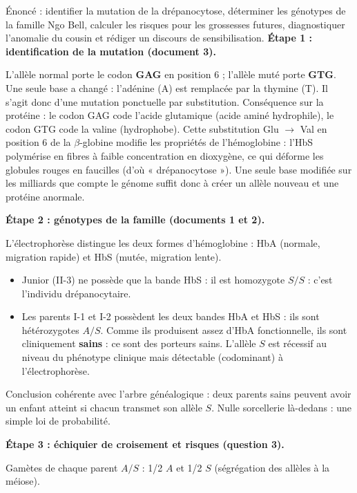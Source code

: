 \documentclass[11pt]{article}
\newcommand{\cle}[1]{{\popxbold\color{popdark}#1}}
\begin{document}
\begin{exoresolu}
Énoncé : identifier la mutation de la drépanocytose, déterminer les génotypes de la famille Ngo Bell, calculer les risques pour les grossesses futures, diagnostiquer l'anomalie du cousin et rédiger un discours de sensibilisation.
\tcblower
\textbf{Étape 1 : identification de la mutation (document 3).}

L'allèle normal porte le codon \textbf{GAG} en position 6 ; l'allèle muté porte \textbf{GTG}. Une seule base a changé : l'adénine (A) est remplacée par la thymine (T). Il s'agit donc d'une \cle{mutation ponctuelle par substitution}. Conséquence sur la protéine : le codon GAG code l'\cle{acide glutamique} (acide aminé hydrophile), le codon GTG code la \cle{valine} (hydrophobe). Cette substitution Glu $\rightarrow$ Val en position 6 de la $\beta$-globine modifie les propriétés de l'hémoglobine : l'HbS polymérise en fibres à faible concentration en dioxygène, ce qui déforme les globules rouges en faucilles (d'où « drépanocytose »). Une seule base modifiée sur les milliards que compte le génome suffit donc à créer un \cle{allèle nouveau} et une protéine anormale.

\textbf{Étape 2 : génotypes de la famille (documents 1 et 2).}

L'électrophorèse distingue les deux formes d'hémoglobine : HbA (normale, migration rapide) et HbS (mutée, migration lente).
\begin{itemize}
\item Junior (II-3) ne possède que la bande HbS : il est \cle{homozygote} $S/S$ : c'est l'individu drépanocytaire.
\item Les parents I-1 et I-2 possèdent les deux bandes HbA et HbS : ils sont \cle{hétérozygotes} $A/S$. Comme ils produisent assez d'HbA fonctionnelle, ils sont cliniquement \textbf{sains} : ce sont des \cle{porteurs sains}. L'allèle $S$ est récessif au niveau du phénotype clinique mais détectable (codominant) à l'électrophorèse.
\end{itemize}
Conclusion cohérente avec l'arbre généalogique : deux parents sains peuvent avoir un enfant atteint si chacun transmet son allèle $S$. Nulle sorcellerie là-dedans : une simple loi de probabilité.

\textbf{Étape 3 : échiquier de croisement et risques (question 3).}

Gamètes de chaque parent $A/S$ : 1/2 $A$ et 1/2 $S$ (ségrégation des allèles à la méiose).


\end{exoresolu}
\end{document}
